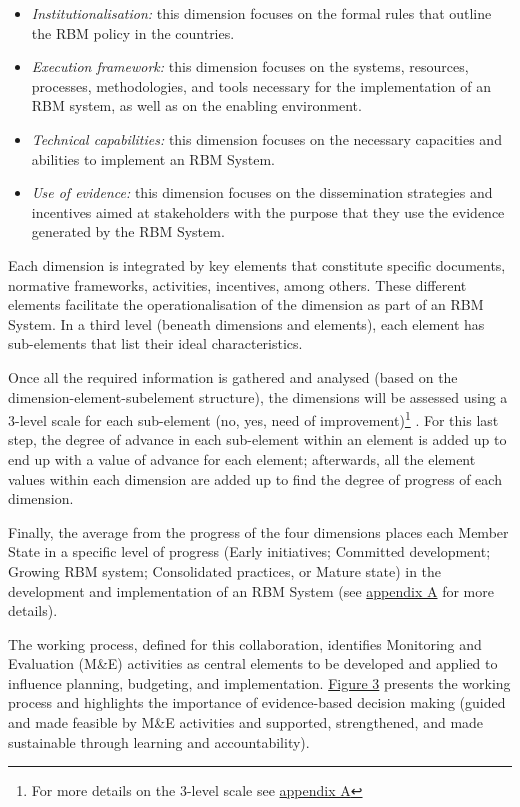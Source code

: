 \documentclass[
]{book}
\begin{document}
\begin{itemize}
\item
  \emph{Institutionalisation:} this dimension focuses on the formal rules that outline the RBM policy in the countries.
\item
  \emph{Execution framework:} this dimension focuses on the systems, resources, processes, methodologies, and tools necessary for the implementation of an RBM system, as well as on the enabling environment.
\item
  \emph{Technical capabilities:} this dimension focuses on the necessary capacities and abilities to implement an RBM System.
\item
  \emph{Use of evidence:} this dimension focuses on the dissemination strategies and incentives aimed at stakeholders with the purpose that they use the evidence generated by the RBM System.
\end{itemize}

Each dimension is integrated by key elements that constitute specific documents, normative frameworks, activities, incentives, among others. These different elements facilitate the operationalisation of the dimension as part of an RBM System. In a third level (beneath dimensions and elements), each element has sub-elements that list their ideal characteristics.

Once all the required information is gathered and analysed (based on the dimension-element-subelement structure), the dimensions will be assessed using a 3-level scale for each sub-element (no, yes, need of improvement)\footnote{For more details on the 3-level scale see \protect\hyperlink{appendixA}{appendix A}} . For this last step, the degree of advance in each sub-element within an element is added up to end up with a value of advance for each element; afterwards, all the element values within each dimension are added up to find the degree of progress of each dimension.

Finally, the average from the progress of the four dimensions places each Member State in a specific level of progress (Early initiatives; Committed development; Growing RBM system; Consolidated practices, or Mature state) in the development and implementation of an RBM System (see \protect\hyperlink{appendixA}{appendix A} for more details).

The working process, defined for this collaboration, identifies Monitoring and Evaluation (M\&E) activities as central elements to be developed and applied to influence planning, budgeting, and implementation. \protect\hyperlink{fig:figure3}{Figure 3} presents the working process and highlights the importance of evidence-based decision making (guided and made feasible by M\&E activities and supported, strengthened, and made sustainable through learning and accountability).
\end{document}
